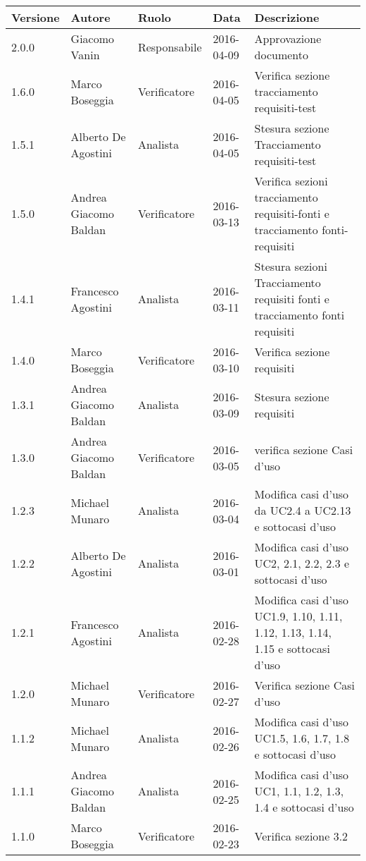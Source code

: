 \documentclass{scalatekids-article}
\begin{document}
\vspace{0cm}
\begin{center}
  \begin{longtable}{| l | l | l | l | p{5cm} |}
    \hline
    Versione & Autore & Ruolo & Data & Descrizione \\
    \hline
    2.0.0 & Giacomo Vanin & Responsabile & 2016-04-09 & Approvazione documento\\
    \hline
    1.6.0 & Marco Boseggia & Verificatore & 2016-04-05 & Verifica sezione tracciamento requisiti-test\\
    \hline
    1.5.1 & Alberto De Agostini & Analista & 2016-04-05 & Stesura sezione Tracciamento requisiti-test\\
    \hline
    1.5.0 & Andrea Giacomo Baldan & Verificatore & 2016-03-13 & Verifica sezioni tracciamento requisiti-fonti e tracciamento fonti-requisiti\\
    \hline
    1.4.1 & Francesco Agostini & Analista & 2016-03-11 & Stesura sezioni Tracciamento requisiti fonti e tracciamento fonti requisiti\\
    \hline
    1.4.0 & Marco Boseggia & Verificatore & 2016-03-10 & Verifica sezione requisiti\\
    \hline
    1.3.1 & Andrea Giacomo Baldan & Analista & 2016-03-09 & Stesura sezione requisiti\\
    \hline
    1.3.0 & Andrea Giacomo Baldan & Verificatore & 2016-03-05 & verifica sezione Casi d'uso\\
    \hline
    1.2.3 & Michael Munaro & Analista & 2016-03-04 & Modifica casi d'uso da UC2.4 a UC2.13 e sottocasi d'uso\\
    \hline
    1.2.2 & Alberto De Agostini & Analista & 2016-03-01 & Modifica casi d'uso UC2, 2.1, 2.2, 2.3 e sottocasi d'uso\\
    \hline
    1.2.1 & Francesco Agostini & Analista & 2016-02-28 & Modifica casi d'uso UC1.9, 1.10, 1.11, 1.12, 1.13, 1.14, 1.15 e sottocasi d'uso\\
    \hline
    1.2.0 & Michael Munaro & Verificatore & 2016-02-27 & Verifica sezione Casi d'uso\\
    \hline
    1.1.2 & Michael Munaro & Analista & 2016-02-26 & Modifica casi d'uso UC1.5, 1.6, 1.7, 1.8 e sottocasi d'uso\\
    \hline
    1.1.1 & Andrea Giacomo Baldan & Analista & 2016-02-25 & Modifica casi d'uso UC1, 1.1, 1.2, 1.3, 1.4 e sottocasi d'uso\\
    \hline
    1.1.0 & Marco Boseggia & Verificatore & 2016-02-23 & Verifica sezione 3.2\\

\end{longtable}
\end{center}
\end{document}
